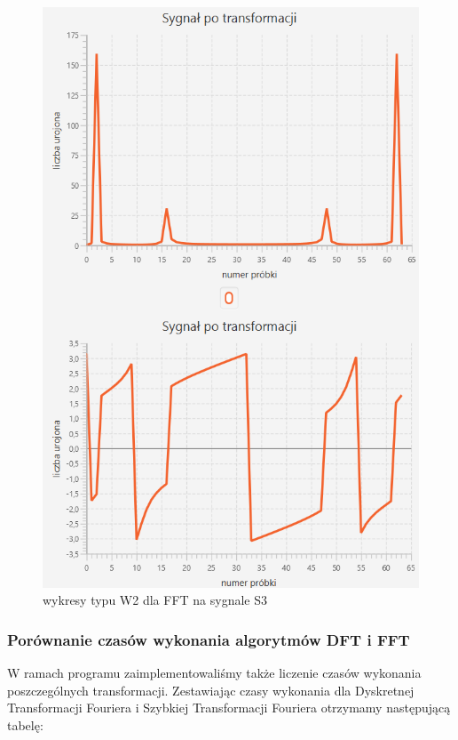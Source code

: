 \documentclass[12pt]{article}
\begin{document}
\begin{figure}[H]
	\centering
	\includegraphics[width=\linewidth]{S3_FFT_W2.png}
	\caption{wykresy typu W2 dla FFT na sygnale S3}
	\label{S3_FFT_W2}
\end{figure}

\subsubsection{Porównanie czasów wykonania algorytmów DFT i FFT}
W ramach programu zaimplementowaliśmy także liczenie czasów wykonania poszczególnych transformacji. Zestawiając czasy wykonania dla Dyskretnej Transformacji Fouriera i Szybkiej Transformacji Fouriera otrzymamy następującą tabelę:
\end{document}
